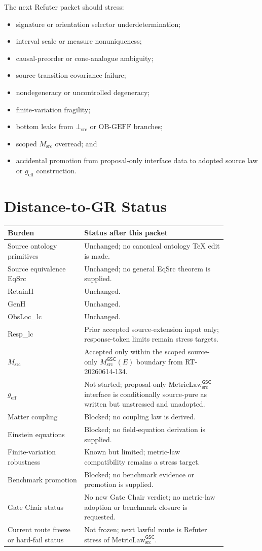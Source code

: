 \documentclass[11pt]{article}
\newcommand{\Msrc}{M_{\mathrm{src}}}
\newcommand{\MsrcGSC}{M_{\mathrm{src}}^{\mathsf{GSC}}}
\newcommand{\MetricLaw}{\mathrm{MetricLaw}_{\mathrm{src}}^{\mathsf{GSC}}}
\newcommand{\BottomSrc}{\bot_{\mathrm{src}}}
\newcommand{\geff}{g_{\mathrm{eff}}}
\begin{document}
The next Refuter packet should stress:

\begin{itemize}[leftmargin=*]
  \item signature or orientation selector underdetermination;
  \item interval scale or measure nonuniqueness;
  \item causal-preorder or cone-analogue ambiguity;
  \item source transition covariance failure;
  \item nondegeneracy or uncontrolled degeneracy;
  \item finite-variation fragility;
  \item bottom leaks from \(\BottomSrc\) or \(\mathrm{OB\mbox{-}GEFF}\)
  branches;
  \item scoped \(\Msrc\) overread; and
  \item accidental promotion from proposal-only interface data to adopted
  source law or \(\geff\) construction.
\end{itemize}

\section{Distance-to-GR Status}

\begin{longtable}{p{0.30\linewidth}p{0.56\linewidth}}
\toprule
Burden & Status after this packet \\
\midrule
Source ontology primitives & Unchanged; no canonical ontology TeX edit is made. \\
Source equivalence EqSrc & Unchanged; no general EqSrc theorem is supplied. \\
RetainH & Unchanged. \\
GenH & Unchanged. \\
ObsLoc\_lc & Unchanged. \\
Resp\_lc & Prior accepted source-extension input only; response-token limits remain stress targets. \\
\(\Msrc\) & Accepted only within the scoped source-only \(\MsrcGSC(E)\) boundary from RT-20260614-134. \\
\(\geff\) & Not started; proposal-only \(\MetricLaw\) interface is conditionally source-pure as written but unstressed and unadopted. \\
Matter coupling & Blocked; no coupling law is derived. \\
Einstein equations & Blocked; no field-equation derivation is supplied. \\
Finite-variation robustness & Known but limited; metric-law compatibility remains a stress target. \\
Benchmark promotion & Blocked; no benchmark evidence or promotion is supplied. \\
Gate Chair status & No new Gate Chair verdict; no metric-law adoption or benchmark closure is requested. \\
Current route freeze or hard-fail status & Not frozen; next lawful route is Refuter stress of \(\MetricLaw\). \\
\bottomrule
\end{longtable}
\end{document}
